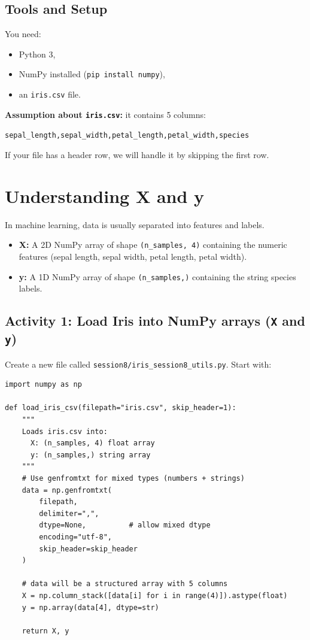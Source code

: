 \subsection{Tools and Setup}
\noindent
You need:
\begin{itemize}\setlength{\itemsep}{0pt}
\item Python 3,
\item NumPy installed (\texttt{pip install numpy}),
\item an \texttt{iris.csv} file.
\end{itemize}

\noindent
\textbf{Assumption about \texttt{iris.csv}:} it contains 5 columns:
\begin{center}
    \texttt{sepal\_length,sepal\_width,petal\_length,petal\_width,species}
\end{center}
If your file has a header row, we will handle it by skipping the first row.

\section{Understanding X and y}
In machine learning, data is usually separated into features and labels. 
\begin{itemize}
    \item \textbf{X:} A 2D NumPy array of shape \texttt{(n\_samples, 4)} containing the numeric features (sepal length, sepal width, petal length, petal width).
    \item \textbf{y:} A 1D NumPy array of shape \texttt{(n\_samples,)} containing the string species labels.
\end{itemize}

\newpage
\subsection{Activity 1: Load Iris into NumPy arrays (\texttt{X} and \texttt{y})}

\noindent
Create a new file called \texttt{session8/iris\_session8\_utils.py}. Start with:

\begin{verbatim}
import numpy as np

def load_iris_csv(filepath="iris.csv", skip_header=1):
    """
    Loads iris.csv into:
      X: (n_samples, 4) float array
      y: (n_samples,) string array
    """
    # Use genfromtxt for mixed types (numbers + strings)
    data = np.genfromtxt(
        filepath,
        delimiter=",",
        dtype=None,          # allow mixed dtype
        encoding="utf-8",
        skip_header=skip_header
    )

    # data will be a structured array with 5 columns
    X = np.column_stack([data[i] for i in range(4)]).astype(float)
    y = np.array(data[4], dtype=str)

    return X, y
\end{verbatim}

